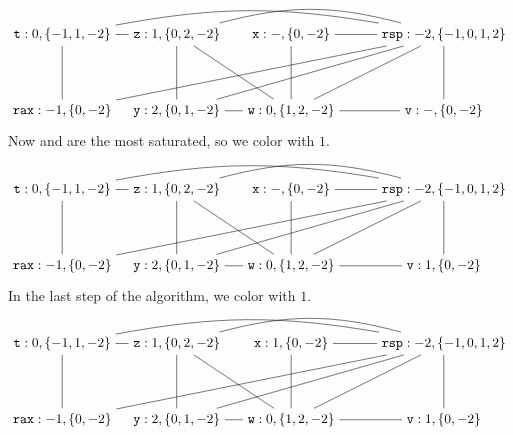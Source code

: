 \documentclass[11pt]{book}
\begin{document}
\[
\begin{tikzpicture}[baseline=(current  bounding  box.center)]
\node (rax) at (0,0) {$\ttm{rax}:-1,\{0,-2\}$};
\node (rsp) at (10,2) {$\ttm{rsp}:-2,\{-1,0,1,2\}$};
\node (t1) at (0,2) {$\ttm{t}:0,\{-1,1,-2\}$};
\node (z) at (3,2)  {$\ttm{z}:1,\{0,2,-2\}$};
\node (x) at (6,2)  {$\ttm{x}:-,\{0,-2\}$};
\node (y) at (3,0)  {$\ttm{y}:2,\{0,1,-2\}$};
\node (w) at (6,0)  {$\ttm{w}:0,\{1,2,-2\}$};
\node (v) at (10,0)  {$\ttm{v}:-,\{0,-2\}$};

\draw (t1) to (rax);
\draw (t1) to (z);
\draw (z) to (y);
\draw (z) to (w);
\draw (x) to (w);
\draw (y) to (w);
\draw (v) to (w);

\draw (v) to (rsp);
\draw (w) to (rsp);
\draw (x) to (rsp);
\draw (y) to (rsp);
\path[-.,bend left=15] (z) edge node {} (rsp);
\path[-.,bend left=10] (t1) edge node {} (rsp);
\draw (rax) to (rsp);
\end{tikzpicture}
\]
Now  and  are the most saturated, so we color  with $1$.
\[
\begin{tikzpicture}[baseline=(current  bounding  box.center)]
\node (rax) at (0,0) {$\ttm{rax}:-1,\{0,-2\}$};
\node (rsp) at (10,2) {$\ttm{rsp}:-2,\{-1,0,1,2\}$};
\node (t1) at (0,2) {$\ttm{t}:0,\{-1,1,-2\}$};
\node (z) at (3,2)  {$\ttm{z}:1,\{0,2,-2\}$};
\node (x) at (6,2)  {$\ttm{x}:-,\{0,-2\}$};
\node (y) at (3,0)  {$\ttm{y}:2,\{0,1,-2\}$};
\node (w) at (6,0)  {$\ttm{w}:0,\{1,2,-2\}$};
\node (v) at (10,0)  {$\ttm{v}:1,\{0,-2\}$};

\draw (t1) to (rax);
\draw (t1) to (z);
\draw (z) to (y);
\draw (z) to (w);
\draw (x) to (w);
\draw (y) to (w);
\draw (v) to (w);

\draw (v) to (rsp);
\draw (w) to (rsp);
\draw (x) to (rsp);
\draw (y) to (rsp);
\path[-.,bend left=15] (z) edge node {} (rsp);
\path[-.,bend left=10] (t1) edge node {} (rsp);
\draw (rax) to (rsp);
\end{tikzpicture}
\]
In the last step of the algorithm, we color  with $1$.
\[
\begin{tikzpicture}[baseline=(current  bounding  box.center)]
\node (rax) at (0,0) {$\ttm{rax}:-1,\{0,-2\}$};
\node (rsp) at (10,2) {$\ttm{rsp}:-2,\{-1,0,1,2\}$};
\node (t1) at (0,2) {$\ttm{t}:0,\{-1,1,-2\}$};
\node (z) at (3,2)  {$\ttm{z}:1,\{0,2,-2\}$};
\node (x) at (6,2)  {$\ttm{x}:1,\{0,-2\}$};
\node (y) at (3,0)  {$\ttm{y}:2,\{0,1,-2\}$};
\node (w) at (6,0)  {$\ttm{w}:0,\{1,2,-2\}$};
\node (v) at (10,0)  {$\ttm{v}:1,\{0,-2\}$};

\draw (t1) to (rax);
\draw (t1) to (z);
\draw (z) to (y);
\draw (z) to (w);
\draw (x) to (w);
\draw (y) to (w);
\draw (v) to (w);

\draw (v) to (rsp);
\draw (w) to (rsp);
\draw (x) to (rsp);
\draw (y) to (rsp);
\path[-.,bend left=15] (z) edge node {} (rsp);
\path[-.,bend left=10] (t1) edge node {} (rsp);
\draw (rax) to (rsp);
\end{tikzpicture}
\]
\end{document}
